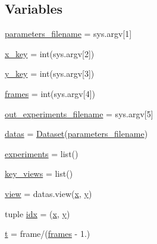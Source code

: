 \subsection*{Variables}
\begin{DoxyCompactItemize}
\item 
\hyperlink{namespacelist__parametric__experiments_aaf67b203e414e9c5207770d5094370aa}{parameters\+\_\+filename} = sys.\+argv\mbox{[}1\mbox{]}
\item 
\hyperlink{namespacelist__parametric__experiments_af334796514611f05918af51dac02b718}{x\+\_\+key} = int(sys.\+argv\mbox{[}2\mbox{]})
\item 
\hyperlink{namespacelist__parametric__experiments_ac93205bc1c86f1e3bf8c370169ef0e60}{y\+\_\+key} = int(sys.\+argv\mbox{[}3\mbox{]})
\item 
\hyperlink{namespacelist__parametric__experiments_a56035b638d3ae7d9452dedd7b3c3ae6c}{frames} = int(sys.\+argv\mbox{[}4\mbox{]})
\item 
\hyperlink{namespacelist__parametric__experiments_ae91646ce20b8406b5e1b06ca8ab4e134}{out\+\_\+experiments\+\_\+filename} = sys.\+argv\mbox{[}5\mbox{]}
\item 
\hyperlink{namespacelist__parametric__experiments_a8c2bc4a9842336c4cb02c5d67b8e6bde}{datas} = \hyperlink{classpylib_1_1dataset_1_1Dataset}{Dataset}(\hyperlink{namespacelist__parametric__experiments_aaf67b203e414e9c5207770d5094370aa}{parameters\+\_\+filename})
\item 
\hyperlink{namespacelist__parametric__experiments_acffac62d78aa32a55ae0bd5909fad5a7}{experiments} = list()
\item 
\hyperlink{namespacelist__parametric__experiments_add5737d5d93dd9d5ef1132a487f0d38c}{key\+\_\+views} = list()
\item 
\hyperlink{namespacelist__parametric__experiments_a9683eb49d1e277163cdce473eab93bfe}{view} = datas.\+view(\hyperlink{namespacelist__parametric__experiments_a2209c6639b1c307f8a8b47b1f2127e39}{x}, \hyperlink{namespacelist__parametric__experiments_a325be8683c949e0cfcd3c92e114fcca4}{y})
\item 
tuple \hyperlink{namespacelist__parametric__experiments_a7be0c13aa83d4467550916592b229540}{idx} = (\hyperlink{namespacelist__parametric__experiments_a2209c6639b1c307f8a8b47b1f2127e39}{x}, \hyperlink{namespacelist__parametric__experiments_a325be8683c949e0cfcd3c92e114fcca4}{y})
\item 
\hyperlink{namespacelist__parametric__experiments_ada91731ac23c09ea7b358830508de2d2}{t} = frame/(\hyperlink{namespacelist__parametric__experiments_a56035b638d3ae7d9452dedd7b3c3ae6c}{frames} -\/ 1.)

\end{DoxyCompactItemize}
